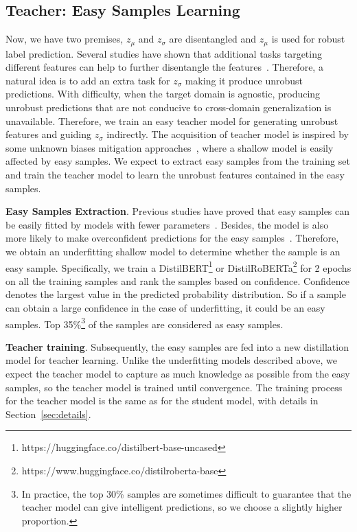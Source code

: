 \documentclass[letterpaper]{article} %
\begin{document}
\subsection{Teacher: Easy Samples Learning}
Now, we have two premises, $z_{\mu}$ and $z_{\sigma}$ are disentangled and $z_{\mu}$ is used for robust label prediction. Several studies have shown that additional tasks targeting different features can help to further disentangle the features~\cite{JohnMBV19, HuangZCWY21}. Therefore, a natural idea is to add an extra task for $z_{\sigma}$ making it produce unrobust predictions. With difficulty, when the target domain is agnostic, producing unrobust predictions that are not conducive to cross-domain generalization is unavailable. Therefore, we train an easy teacher model for generating unrobust features and guiding $z_{\sigma}$ indirectly. The acquisition of teacher model is inspired by some unknown biases mitigation approaches~\cite{UtamaMG20, UtamaMG20b}, where a shallow model is easily affected by easy samples. We expect to extract easy samples from the training set and train the teacher model to learn the unrobust features contained in the easy samples. 

\textbf{Easy Samples Extraction}. Previous studies have proved that easy samples can be easily fitted by models with fewer parameters~\cite{LaiZFHZ21}. Besides, the model is also more likely to make overconfident predictions for the easy samples~\cite{DuMJDDGSH21}. Therefore, we obtain an underfitting shallow model to determine whether the sample is an easy sample. Specifically, we train a DistilBERT\footnote{https://huggingface.co/distilbert-base-uncased} or DistilRoBERTa\footnote{https://www.huggingface.co/distilroberta-base} for 2 epochs on all the training samples and rank the samples based on confidence. Confidence denotes the largest value in the predicted probability distribution. So if a sample can obtain a large confidence in the case of underfitting, it could be an easy samples. Top 35\%\footnote{In practice, the top 30\% samples are sometimes difficult to guarantee that the teacher model can give intelligent predictions, so we choose a slightly higher proportion.} of the samples are considered as easy samples. 

\textbf{Teacher training}. Subsequently, the easy samples are fed into a new distillation model for teacher learning. Unlike the underfitting models described above, we expect the teacher model to capture as much knowledge as possible from the easy samples, so the teacher model is trained until convergence. The training process for the teacher model is the same as for the student model, with details in Section~\ref{sec:details}.
\end{document}
